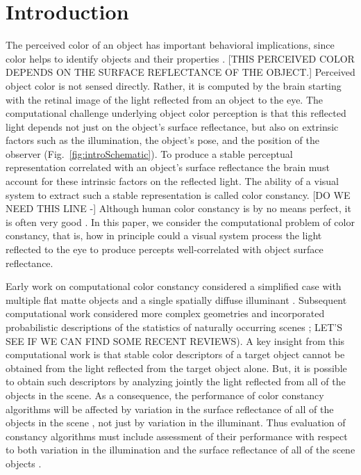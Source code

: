 \documentclass{jov}
\begin{document}
\section{Introduction}
The perceived color of an object has important behavioral implications, since color helps to identify objects and their properties \cite{Mollon89, Jacobs81}.
[THIS PERCEIVED COLOR DEPENDS ON THE SURFACE REFLECTANCE OF THE OBJECT.]
Perceived object color is not sensed directly. Rather, it is computed by the brain starting with the retinal image of the light reflected from an object to the eye.
The computational challenge underlying object color perception is that this reflected light depends not just on the object's surface reflectance, but also on extrinsic factors such as the illumination, the object's pose, and the position of the observer (Fig.~\ref{fig:introSchematic}).
To produce a stable perceptual representation correlated with an object's surface reflectance the brain must account for these intrinsic factors on the reflected light.
The ability of a visual system to extract such a stable representation is called color constancy. 
[DO WE NEED THIS LINE -] Although human color constancy is by no means perfect, it is often very good \cite{FosterColorConstancy, BrainardColorConstancy}. 
In this paper, we consider the computational problem of color constancy, that is, how in principle could a visual system process the light reflected to the eye to produce percepts well-correlated with object surface reflectance.

Early work on computational color constancy considered a simplified case with multiple flat matte objects and a single spatially diffuse illuminant \cite{LandRetinex,Buchsbaum80,MaloneyWandell86}. Subsequent computational work considered more complex geometries and incorporated probabilistic descriptions of the statistics of naturally occurring scenes \cite{funt1988color, D'ZmuraConstancy3, barron2012color, D'ZmuraIversonSinger,BrainardFreeman}; LET'S SEE IF WE CAN FIND SOME RECENT REVIEWS).
A key insight from this computational work is that stable color descriptors of a target object cannot be obtained from the light reflected from the target object alone.  But, it is possible to obtain such descriptors by analyzing jointly the light reflected from all of the objects in the scene.
As a consequence, the performance of color constancy algorithms will be affected by variation in the surface reflectance of all of the objects in the scene \cite{BrainardWandellRetinex}, not just by variation in the illuminant. Thus evaluation of constancy algorithms must include assessment of their performance with respect to both variation in the illumination and the surface reflectance of all of the scene objects \cite{BrainardWandellRetinex,BrainardFreeman}. 
\end{document}
